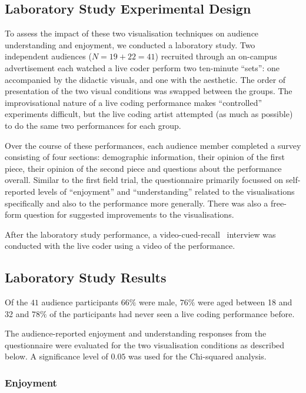 \documentclass{sig-alternate}
\begin{document}
\subsection{Laboratory Study Experimental Design}

To assess the impact of these two visualisation techniques on audience
understanding and enjoyment, we conducted a laboratory study. Two independent
audiences ($N=19+22=41$) recruited through an on-campus advertisement
each watched a live coder perform two ten-minute ``sets'': one
accompanied by the didactic visuals, and one with the aesthetic. The
order of presentation of the two visual conditions was swapped between
the groups. The improvisational nature of a live coding performance
makes ``controlled'' experiments difficult, but the live coding artist
attempted (as much as possible) to do the same two performances for
each group.

Over the course of these performances, each audience member completed
a survey consisting of four sections: demographic information, their
opinion of the first piece, their opinion of the second piece and
questions about the performance overall. Similar to the first field
trial, the questionnaire primarily focussed on self-reported levels of
``enjoyment'' and ``understanding'' related to the visualisations
specifically and also to the performance more generally. There was
also a free-form question for suggested improvements to the
visualisations.

After the laboratory study performance, a
video-cued-recall~\cite{Suchman:1992tk} interview was conducted with
the live coder using a video of the performance.

\subsection{Laboratory Study Results}

Of the $41$ audience participants $66\%$ were male, $76\%$ were aged
between 18 and 32 and $78\%$ of the participants had never seen a live
coding performance before.

The audience-reported enjoyment and understanding responses from the
questionnaire were evaluated for the two visualisation conditions as
described below. A significance level of $0.05$ was used for the
Chi-squared analysis.

\subsubsection{Enjoyment}
\end{document}
